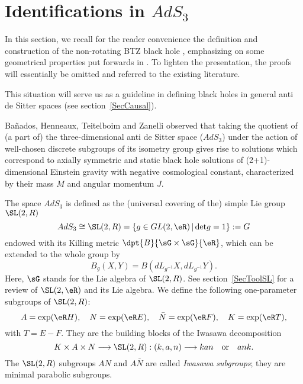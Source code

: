 \section{Identifications in \texorpdfstring{$AdS_3$}{AdS3}}\label{secBTZ}

In this section, we recall for the reader convenience the definition and construction of the non-rotating BTZ black hole \cite{BTZ_un,BTZ_deux}, emphasizing on some geometrical properties put forwards in \cite{BTZB_un,BDRS,Keio,Clement}. To lighten the presentation, the proofs will essentially be omitted and referred to the existing literature.

This situation will serve us as a guideline in defining black holes in general anti de Sitter spaces (see section~\ref{SecCausal}).

Ba\~nados, Henneaux, Teitelboim and Zanelli observed that taking the quotient of (a part of) the three-dimensional anti de Sitter space ($AdS_3$) under the action of well-chosen discrete subgroups of its isometry group gives rise to solutions which correspond to axially symmetric and static black hole solutions of (2+1)-dimensional Einstein gravity with negative cosmological constant, characterized by their mass $M$ and angular momentum $J$.

The space $AdS_3$ is defined as the (universal covering of the) simple Lie group $\SL(2,R)$
\begin{equation}\label{AdS3}
AdS_3 \cong \SL(2,R) = \{g \in GL(2,\eR) \, | \, \mbox{det} g = 1 \}:= G
\end{equation}
endowed with its Killing metric $\dpt{B}{\sG\times\sG}{\eR}$, which can be extended to the whole group by
\begin{equation}
B_g(X,Y)=B(dL_{g^{-1}}X,dL_{g^{-1}}Y).
\end{equation}
Here, $\sG$ stands for the Lie algebra of $\SL(2,R)$. See section~\ref{SecToolSL} for a review of $\SL(2,\eR)$ and its Lie algebra. We define the following one-parameter subgroups of $\SL(2,R)$:
\begin{equation}\label{IwasawaSubgroups}
A = \exp(\eR H), \quad  N = \exp(\eR E), \quad \bar{N}=\exp(\eR
F), \quad K=\exp(\eR T),
\end{equation}
with $T=E-F$. They are the building blocks of the Iwasawa decomposition
\begin{equation}
K \times A \times N \longrightarrow \SL(2,R): (k,a,n)
\longrightarrow kan \quad \mbox{or} \quad ank.
 \end{equation}
 The $\SL(2,R)$ subgroups $AN$ and $A\bar{N}$ are called \emph{Iwasawa subgroups}; they are minimal parabolic subgroups.

